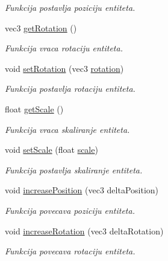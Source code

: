 \begin{DoxyCompactItemize}
\begin{DoxyCompactList}\small\item\em Funkcija postavlja poziciju entiteta. \end{DoxyCompactList}\item 
vec3 \hyperlink{classentity_1_1Entity_a58680b88c9179d9cab22e881b320f9f7}{get\+Rotation} ()
\begin{DoxyCompactList}\small\item\em Funkcija vraca rotaciju entiteta. \end{DoxyCompactList}\item 
void \hyperlink{classentity_1_1Entity_a830cb1b8769d11322844a34f1e480e4b}{set\+Rotation} (vec3 \hyperlink{classentity_1_1Entity_aedb4c5dc1cfbc8cb3f6deb565ea920cb}{rotation})
\begin{DoxyCompactList}\small\item\em Funkcija postavlja rotaciju entiteta. \end{DoxyCompactList}\item 
float \hyperlink{classentity_1_1Entity_a1923a9ecf9da2ec77d6e3eeadb4bd4d7}{get\+Scale} ()
\begin{DoxyCompactList}\small\item\em Funkcija vraca skaliranje entiteta. \end{DoxyCompactList}\item 
void \hyperlink{classentity_1_1Entity_a5d2d7bd6cd754ce566e2d4a9e4b991e0}{set\+Scale} (float \hyperlink{classentity_1_1Entity_a59e5d5e3575df70cd5c74b5d739d84ca}{scale})
\begin{DoxyCompactList}\small\item\em Funkcija postavlja skaliranje entiteta. \end{DoxyCompactList}\item 
void \hyperlink{classentity_1_1Entity_a24a22a1554a3a412cc2583bbf87fd77c}{increase\+Position} (vec3 delta\+Position)
\begin{DoxyCompactList}\small\item\em Funkcija povecava poziciju entiteta. \end{DoxyCompactList}\item 
void \hyperlink{classentity_1_1Entity_ac5bd766ea7810db89b8948160916768a}{increase\+Rotation} (vec3 delta\+Rotation)
\begin{DoxyCompactList}\small\item\em Funkcija povecava rotaciju entiteta. \end{DoxyCompactList}\end{DoxyCompactItemize}
